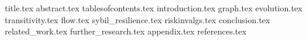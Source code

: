 \documentclass[11pt]{llncs}
\begin{document}
{title.tex}
\thispagestyle{plain}
{abstract.tex}
{tablesofcontents.tex}
{introduction.tex}
{graph.tex}
{evolution.tex}
{transitivity.tex}
{flow.tex}
{sybil_resilience.tex}
{riskinvalgs.tex}
{conclusion.tex}
{related_work.tex}
{further_research.tex}
{appendix.tex}
\newpage
{references.tex}
\end{document}

